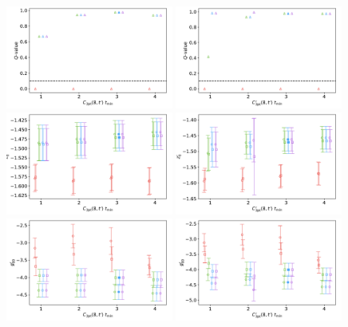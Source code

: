 \documentclass[prd,aps,twocolumn,superscriptaddress,tightenlines,nofootinbib,floatfix,preprintnumbers,10pt]{revtex4-1}
\begin{document}
\newpage
\begin{figure}[h]{
		\includegraphics[width=0.49\textwidth]{plots/figures/gV8_Q.pdf}
		\includegraphics[width=0.49\textwidth]{plots/figures/dgV8_Q.pdf}
		\includegraphics[width=0.49\textwidth]{plots/figures/gV8_dZ0.pdf}
		\includegraphics[width=0.49\textwidth]{plots/figures/dgV8_dZ0.pdf}
		\includegraphics[width=0.49\textwidth]{plots/figures/gV8_dgV.pdf}
		\includegraphics[width=0.49\textwidth]{plots/figures/dgV8_dgV.pdf}
}
\end{figure}
\end{document}
